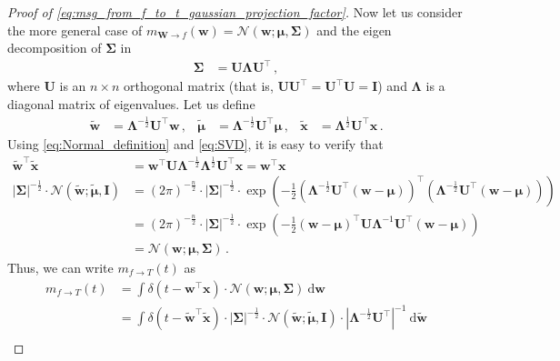 \documentclass[a4paper]{article}
\newcommand{\Normal}[3]{{\mathcal N} \left({#1};{#2},{#3}\right)}
\newcommand{\bs}[1]{{\boldsymbol{#1}}}
\newcommand{\dirac}[1]{{\delta \left( {#1} \right)}}
\newcommand{\intd}[1]{\ \mathrm{d}{#1}}
\newcommand{\transpose}[1]{{#1}^\top}
\theoremstyle{definition}
\begin{document}
\begin{proof}[Proof of \eqref{eq:msg_from_f_to_t_gaussian_projection_factor}]
    Now let us consider the more general case of $m_{\bs{W} \to f}(\bs{w}) = \Normal{\bs{w}}{\bs{\mu}}{\bs{\Sigma}}$ and the eigen decomposition of $\bs{\Sigma}$ in
    \begin{align}
        \bs{\Sigma} & = \bs{U} \bs{\Lambda} \transpose{\bs{U}} \,, \label{eq:SVD}
    \end{align}
    where $\bs{U}$ is an $n \times n$ orthogonal matrix (that is, $\bs{U}\transpose{\bs{U}} = \transpose{\bs{U}}\bs{U} = \mathbf{I}$) and $\bs{\Lambda}$ is a diagonal matrix of eigenvalues. Let us define
    \begin{align*}
        \widetilde{\bs{w}} & = \bs{\Lambda}^{-\frac{1}{2}} \transpose{\bs{U}} \bs{w} \,, & 
        \widetilde{\bs{\mu}} & = \bs{\Lambda}^{-\frac{1}{2}} \transpose{\bs{U}} \bs{\mu} \,, & 
        \widetilde{\bs{x}} & = \bs{\Lambda}^{\frac{1}{2}} \transpose{\bs{U}} \bs{x} \,.
    \end{align*}
    Using \eqref{eq:Normal_definition} and \eqref{eq:SVD}, it is easy to verify that
    \begin{align*}
        \transpose{\widetilde{\bs{w}}}\widetilde{\bs{x}} & = \transpose{\bs{w}} \bs{U} \bs{\Lambda}^{-\frac{1}{2}} \bs{\Lambda}^{\frac{1}{2}} \transpose{\bs{U}} \bs{x} = \transpose{\bs{w}}\bs{x} \\
        \left|\bs{\Sigma}\right|^{-\frac{1}{2}} \cdot \Normal{\widetilde{\bs{w}}}{\widetilde{\bs{\mu}}}{\mathbf{I}} & = \left(2\pi\right)^{-\frac{n}{2}} \cdot \left|\bs{\Sigma}\right|^{-\frac{1}{2}} \cdot \exp \left( -\frac{1}{2} \transpose{\left( \bs{\Lambda}^{-\frac{1}{2}} \transpose{\bs{U}} \left( \bs{w}-\bs{\mu} \right) \right)} \left( \bs{\Lambda}^{-\frac{1}{2}} \transpose{\bs{U}} \left( \bs{w}-\bs{\mu} \right) \right) \right) \\ 
        & = \left(2\pi\right)^{-\frac{n}{2}} \cdot \left|\bs{\Sigma}\right|^{-\frac{1}{2}} \cdot \exp \left( -\frac{1}{2} \transpose{\left( \bs{w}-\bs{\mu} \right)} \bs{U} \bs{\Lambda}^{-1} \transpose{\bs{U}} \left( \bs{w}-\bs{\mu} \right) \right) \\
        & = \Normal{\bs{w}}{\bs{\mu}}{\bs{\Sigma}} \,.
    \end{align*}
    Thus, we can write $m_{f\rightarrow T} (t)$ as 
    \begin{align*}
        m_{f\rightarrow T} (t) & = \int \dirac{t - \transpose{\bs{w}}\bs{x}} \cdot \Normal{\bs{w}}{\bs{\mu}}{\bs{\Sigma}} \intd{\bs{w}} \\
        & = \int \dirac{t - \transpose{\widetilde{\bs{w}}}\widetilde{\bs{x}}} \cdot \left|\bs{\Sigma}\right|^{-\frac{1}{2}} \cdot \Normal{\widetilde{\bs{w}}}{\widetilde{\bs{\mu}}}{\mathbf{I}} \cdot \left| \bs{\Lambda}^{-\frac{1}{2}} \transpose{\bs{U}} \right|^{-1}  \intd{\widetilde{\bs{w}}} \\

\end{align*}
\end{proof}
\end{document}
